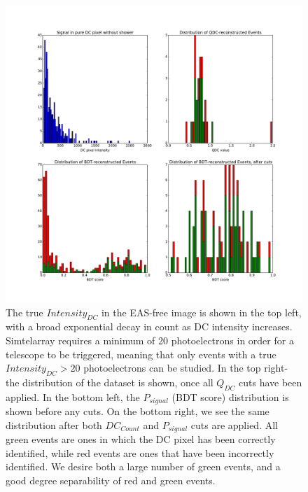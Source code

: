 \documentclass[]{article}
\begin{document}
\begin{figure}
\begin{center}
\includegraphics[width=\textwidth]{cutdistribution1None}
\caption{The true $Intensity_{DC}$ in the EAS-free image is shown in the top left, with a broad exponential decay in count as DC intensity increases. Sim\textunderscore telarray requires a minimum of 20 photoelectrons in order for a telescope to be triggered, meaning that only events with a true $Intensity_{DC}>20$ photoelectrons can be studied.  In the top right- the distribution of the dataset is shown, once all $Q_{DC}$ cuts have been applied. In the bottom left, the $P_{signal}$ (BDT score) distribution is shown before any cuts. On the bottom right, we see the same distribution after both $DC_{Count}$ and $P_{signal}$ cuts are applied. All green events are ones in which the DC pixel has been correctly identified, while red events are ones that have been incorrectly identified. We desire both a large number of green events, and a good degree separability of red and green events.}
\label{fig:cutdistribution}
\end{center}
\end{figure} 
\end{document}
